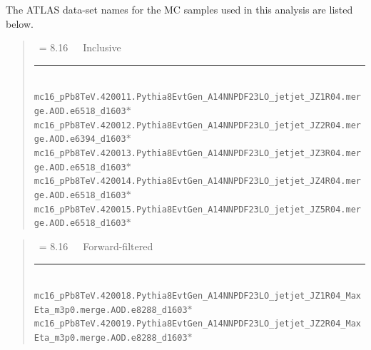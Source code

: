 The ATLAS data-set names for the MC samples used in this analysis are listed below.
\begin{quote}
    \SNN\ = 8.16~\TeV\ \pxPb\ Inclusive\\
    \noindent\rule{12cm}{0.4pt}\\
    {\scriptsize
        \texttt{mc16\_pPb8TeV.420011.Pythia8EvtGen\_A14NNPDF23LO\_jetjet\_JZ1R04.merge.AOD.e6518\_d1603$*$}\\
        \texttt{mc16\_pPb8TeV.420012.Pythia8EvtGen\_A14NNPDF23LO\_jetjet\_JZ2R04.merge.AOD.e6394\_d1603$*$}\\
        \texttt{mc16\_pPb8TeV.420013.Pythia8EvtGen\_A14NNPDF23LO\_jetjet\_JZ3R04.merge.AOD.e6518\_d1603$*$}\\
        \texttt{mc16\_pPb8TeV.420014.Pythia8EvtGen\_A14NNPDF23LO\_jetjet\_JZ4R04.merge.AOD.e6518\_d1603$*$}\\
        \texttt{mc16\_pPb8TeV.420015.Pythia8EvtGen\_A14NNPDF23LO\_jetjet\_JZ5R04.merge.AOD.e6518\_d1603$*$}\\
    }
\end{quote}
\begin{quote}
    \SNN\ = 8.16~\TeV\ \pxPb\ Forward-filtered\\
    \noindent\rule{12cm}{0.4pt}\\
    {\scriptsize
        \texttt{mc16\_pPb8TeV.420018.Pythia8EvtGen\_A14NNPDF23LO\_jetjet\_JZ1R04\_MaxEta\_m3p0.merge.AOD.e8288\_d1603$*$}\\
        \texttt{mc16\_pPb8TeV.420019.Pythia8EvtGen\_A14NNPDF23LO\_jetjet\_JZ2R04\_MaxEta\_m3p0.merge.AOD.e8288\_d1603$*$}\\
    }
\end{quote}
